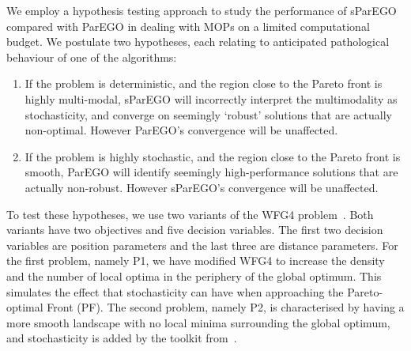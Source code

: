 \documentclass{llncs}
\begin{document}
We employ a hypothesis testing approach to study the performance of sParEGO compared with ParEGO in dealing with MOPs on a limited computational budget. We postulate two hypotheses, each relating to anticipated pathological behaviour of one of the algorithms:
\begin{enumerate}
 \item If the problem is deterministic, and the region close to the Pareto front is highly multi-modal, sParEGO will incorrectly interpret the multimodality as stochasticity, and converge on seemingly `robust' solutions that are actually non-optimal. However ParEGO's convergence will be unaffected.
 \item If the problem is highly stochastic, and the region close to the Pareto front is smooth, ParEGO will identify seemingly high-performance solutions that are actually non-robust. However sParEGO's convergence will be unaffected.
\end{enumerate}

To test these hypotheses, we use two variants of the WFG4 problem~\cite{bib:wfg_2006}. Both variants have two objectives and five decision variables. The first two decision variables are position parameters and the last three are distance parameters. For the first problem, namely P1, we have modified WFG4 to increase the density and the number of local optima in the periphery of the global optimum. This simulates the effect that stochasticity can have when approaching the Pareto-optimal Front (PF). The second problem, namely P2, is characterised by having a more smooth landscape with no local minima surrounding the global optimum, and stochasticity is added by the toolkit from~\cite{Salomon2016Toolkit}.
\end{document}
